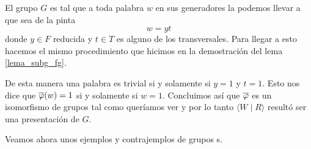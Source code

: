\documentclass[tesis.tex]{subfiles}
\begin{document}
\begin{obs}
	El grupo  $G$ es tal que a toda palabra $w$ en sus generadores la podemos llevar a que sea de la pinta
	\[
		w = yt
	\]
	donde $y \in F$ reducida y $t \in T$ es alguno de los transversales. 
	Para llegar a esto hacemos el mismo procedimiento que hicimos en la demostración del lema \ref{lema_subg_fg}.
	
	De esta manera una palabra es trivial si y solamente si $y=1$ y $t=1$. 
	Esto nos dice que $\overline \varphi(w) = 1$ si y solamente si $w=1$. 
	Concluimos así que $\overline \varphi$ es un isomorfismo de grupos tal como queríamos ver y por lo tanto  $\langle W \mid R \rangle$ resultó ser una presentación de $G$.
	
\end{obs}
\medskip

Veamos ahora unos ejemplos y contrajemplos de grupos \vl s.
\end{document}
